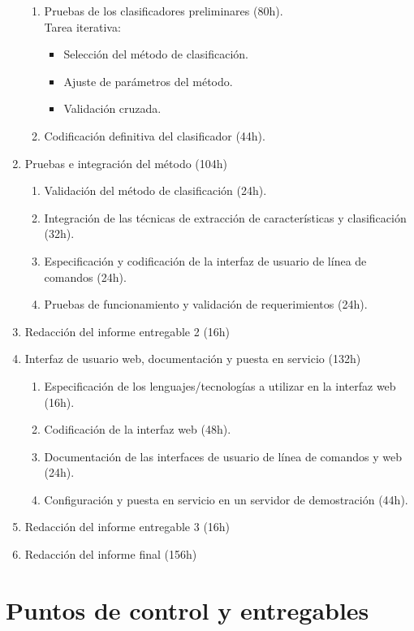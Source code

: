 \documentclass[12pt,bibliography=oldstyle,DIV=12,parskip=half-]{scrreprt}
\begin{document}
\begin{enumerate}
\begin{enumerate}
  \item Pruebas de los clasificadores preliminares (80h).\\
    Tarea iterativa:
    \begin{itemize}
    \item Selección del método de clasificación.
    \item Ajuste de parámetros del método.
    \item Validación cruzada.
    \end{itemize}
  \item Codificación definitiva del clasificador (44h).
  \end{enumerate}
\item Pruebas e integración del método (104h)
  \begin{enumerate}
  \item Validación del método de clasificación (24h).
  \item Integración de las técnicas de extracción de características y
    clasificación (32h).
  \item Especificación y codificación de la interfaz de usuario de
    línea de comandos (24h).
  \item Pruebas de funcionamiento y validación de requerimientos (24h).
  \end{enumerate}
\item Redacción del informe entregable 2 (16h)
\item Interfaz de usuario web, documentación y puesta en servicio (132h)
  \begin{enumerate}
  \item Especificación de los lenguajes/tecnologías a utilizar en la
    interfaz web (16h).
  \item Codificación de la interfaz web (48h).
  \item Documentación de las interfaces de usuario de línea de
    comandos y web (24h).
  \item Configuración y puesta en servicio en un servidor de demostración
    (44h).
  \end{enumerate}
\item Redacción del informe entregable 3 (16h)
\item Redacción del informe final (156h)
\end{enumerate}
%
%
\section{Puntos de control y entregables}
\end{document}
